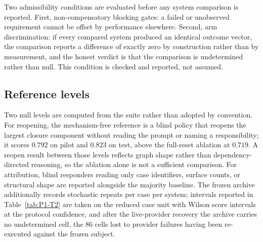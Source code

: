 Two admissibility conditions are evaluated before any system comparison is
reported. First, non-compensatory blocking gates: a failed or unobserved
requirement cannot be offset by performance elsewhere. Second, arm
discrimination: if every compared system produced an identical outcome vector,
the comparison reports a difference of exactly zero by construction rather than
by measurement, and the honest verdict is that the comparison is undetermined
rather than null. This condition is checked and reported, not assumed.

\subsection{Reference levels}

Two null levels are computed from the suite rather than adopted by convention.
For reopening, the mechanism-free reference is a blind policy that reopens the
largest closure component without reading the prompt or naming a
responsibility; it scores $0.792$ on pilot and $0.823$ on test, above the
full-reset ablation at $0.719$. A reopen result between those levels reflects
graph shape rather than dependency-directed reasoning, so the ablation alone is
not a sufficient comparison. For attribution, blind responders reading only case
identifiers, surface counts, or structural shape are reported alongside the
majority baseline. The frozen archive additionally records
\StochasticRepeats{} stochastic repeats per case per system; intervals reported
in Table~\ref{tab:P1-T2} are taken on the reduced case unit with Wilson score
intervals at the protocol confidence, and after the live-provider recovery the
archive carries no undetermined cell, the 86 cells lost to provider failures
having been re-executed against the frozen subject.
